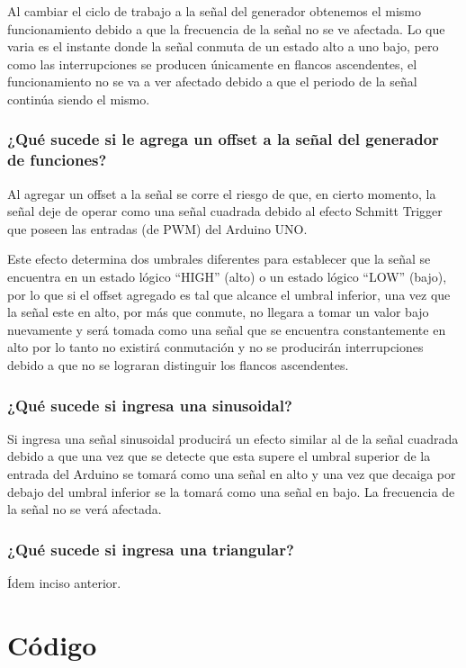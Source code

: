 \documentclass[a4paper, 12pt]{article}
\begin{document}
Al cambiar el ciclo de trabajo a la señal del generador obtenemos el mismo funcionamiento debido a que la frecuencia de la señal no se ve afectada. Lo que varia es el instante donde la señal conmuta de un estado alto a uno bajo, pero como las interrupciones se producen únicamente en flancos ascendentes, el funcionamiento no se va a ver afectado debido a que el periodo de la señal continúa siendo el mismo.

\subsubsection{¿Qué sucede si le agrega un offset a la señal del generador de funciones?}

Al agregar un offset a la señal se corre el riesgo de que, en cierto momento, la señal deje de operar como una señal cuadrada debido al efecto Schmitt Trigger que poseen las entradas (de PWM) del Arduino UNO.

Este efecto determina dos umbrales diferentes para establecer que la señal se encuentra en un estado lógico ``HIGH'' (alto) o un estado lógico ``LOW'' (bajo), por lo que si el offset agregado es tal que alcance el umbral inferior, una vez que la señal este en alto, por más que conmute, no llegara a tomar un valor bajo nuevamente y será tomada como una señal que se encuentra constantemente en alto por lo tanto no existirá conmutación y no se producirán interrupciones debido a que no se lograran distinguir los flancos ascendentes.

\subsubsection{¿Qué sucede si ingresa una sinusoidal?}

Si ingresa una señal sinusoidal producirá un efecto similar al de la señal cuadrada debido a que una vez que se detecte que esta supere el umbral superior de la entrada del Arduino se tomará como una señal en alto y una vez que decaiga por debajo del umbral inferior se la tomará como una señal en bajo. La frecuencia de la señal no se verá afectada.

\subsubsection{¿Qué sucede si ingresa una triangular?}

Ídem inciso anterior.

\section{Código}

\small{}
 
\end{document}
